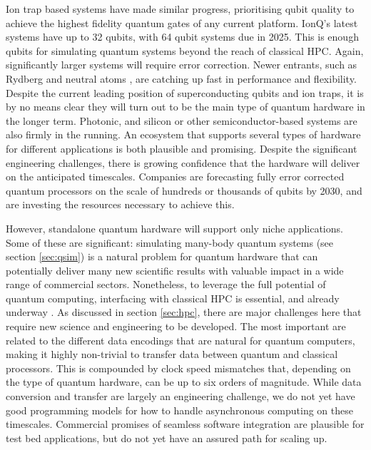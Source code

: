\documentclass[10pt]{iopart}
\begin{document}
Ion trap based systems have made similar progress, prioritising qubit quality to achieve the highest fidelity quantum gates of any current platform.  IonQ's latest systems have up to 32 qubits, with 64 qubit systems due in 2025.  This is enough qubits for simulating quantum systems beyond the reach of classical HPC. Again, significantly larger systems will require error correction. Newer entrants, such as Rydberg \cite{Cong2022} and neutral atoms \cite{Wintersperger2023}, are catching up fast in performance and flexibility. Despite the current leading position of superconducting qubits and ion traps, it is by no means clear they will turn out to be the main type of quantum hardware in the longer term.  Photonic, and silicon or other semiconductor-based systems are also firmly in the running. An ecosystem that supports several types of hardware for different applications is both plausible and promising. Despite the significant engineering challenges, there is growing confidence that the hardware will deliver on the anticipated timescales. Companies are forecasting fully error corrected quantum processors on the scale of hundreds or thousands of qubits by 2030, and are investing the resources necessary to achieve this.

However, standalone quantum hardware will support only niche applications.  Some of these are significant: simulating many-body quantum systems (see section \ref{sec:qsim}) is a natural problem for quantum hardware that can potentially deliver many new scientific results with valuable impact in a wide range of commercial sectors.  Nonetheless, to leverage the full potential of quantum computing, interfacing with classical HPC is essential, and already underway \cite{HPCQS2023}. As discussed in section \ref{sec:hpc}, there are major challenges here that require new science and engineering to be developed.  The most important are related to the different data encodings that are natural for quantum computers, making it highly non-trivial to transfer data between quantum and classical processors.  This is compounded by clock speed mismatches that, depending on the type of quantum hardware, can be up to six orders of magnitude.  While data conversion and transfer are largely an engineering challenge, we do not yet have good programming models for how to handle asynchronous computing on these timescales. Commercial promises of seamless software integration are plausible for test bed applications, but do not yet have an assured path for scaling up.
\end{document}
